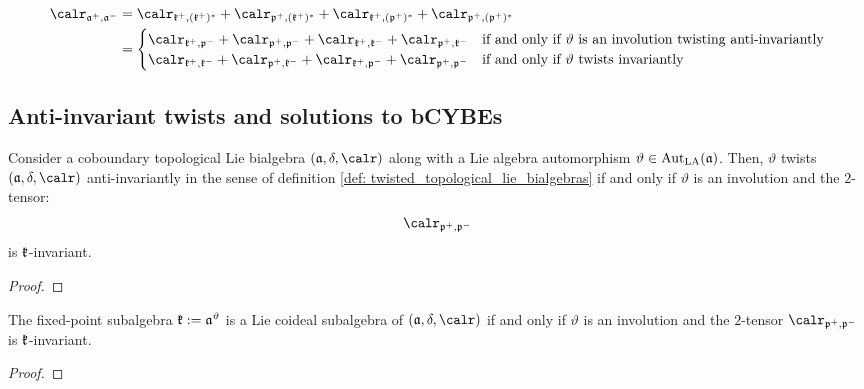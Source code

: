             \begin{equation} \label{equation: symmetric_space_decomposition_of_casimir_tensors}
                \begin{aligned}
                    \calr_{\a^+, \a^-} & = \calr_{\k^+, (\k^+)^*} + \calr_{\p^+, (\k^+)^*} + \calr_{\k^+, (\p^+)^*} + \calr_{\p^+, (\p^+)^*}
                    \\
                    & =
                    \begin{cases}
                        \calr_{\k^+, \p^-} + \calr_{\p^+, \p^-} + \calr_{\k^+, \k^-} + \calr_{\p^+, \k^-} & \text{if and only if $\vartheta$ is an involution twisting anti-invariantly}
                        \\
                        \calr_{\k^+, \k^-} + \calr_{\p^+, \k^-} + \calr_{\k^+, \p^-} + \calr_{\p^+, \p^-} & \text{if and only if $\vartheta$ twists invariantly}
                    \end{cases}
                \end{aligned}
            \end{equation}

    \subsection{Anti-invariant twists and solutions to bCYBEs} \label{subsection: anti_invariantly_twisted_coboundary_topological_lie_bialgebras}
        \begin{theorem} \label{theorem: invariance_criterion_anti_invariant_twists}
            Consider a coboundary topological Lie bialgebra $(\a, \delta, \calr)$ along with a Lie algebra automorphism $\vartheta \in \operatorname{Aut}_{\mathrm{LA}}(\mathfrak{a})$. Then, $\vartheta$ twists $(\a, \delta, \calr)$ anti-invariantly in the sense of definition \ref{def: twisted_topological_lie_bialgebras} if and only if $\vartheta$ is an involution and the $2$-tensor:
                $$\calr_{\p^+, \p^-}$$
            is $\mathfrak{k}$-invariant.
        \end{theorem}
            \begin{proof}
                
            \end{proof}
        \begin{corollary}
            The fixed-point subalgebra $\mathfrak{k} := \mathfrak{a}^{\vartheta}$ is a Lie coideal subalgebra of $(\a, \delta, \calr)$ if and only if $\vartheta$ is an involution and the $2$-tensor $\calr_{\p^+, \p^-}$ is $\mathfrak{k}$-invariant.
        \end{corollary}
            \begin{proof}
                
            \end{proof}
    
